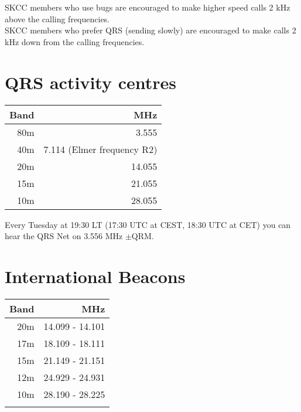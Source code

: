 \documentclass[10pt]{article}
\begin{document}
\begin{multicols}{3}
SKCC members who use bugs are encouraged to make higher speed calls 2 kHz above the calling frequencies.\\ 

SKCC members who prefer QRS (sending slowly) are encouraged to make calls 2 kHz down from the calling frequencies.

\section{QRS activity centres}
\vspace{\baselineskip}
\begin{tabular}{rr}
Band & MHz\\ \hline 
 80m & 3.555\\
 40m & 7.114 (Elmer frequency R2)\\
 20m & 14.055\\
 15m & 21.055\\
 10m & 28.055\\
\end{tabular}
\vspace{\baselineskip}

Every Tuesday at 19:30 LT (17:30 UTC at CEST, 18:30 UTC at CET) you can hear the QRS Net on 3.556 MHz $\pm$QRM. 

\section{International Beacons}

\begin{tabular}{rr}
Band & MHz \\ \hline 
 20m & 14.099 - 14.101 \\ 
 17m & 18.109 - 18.111 \\ 
 15m & 21.149 - 21.151 \\ 
 12m & 24.929 - 24.931 \\ 
 10m & 28.190 - 28.225 \\
     &       \\     
\end{tabular}


\end{multicols}
\end{document}
